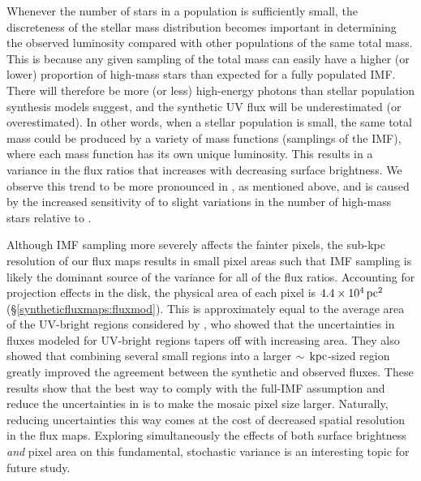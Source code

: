 \documentclass[iop, tighten]{emulateapj}
\begin{document}
Whenever the number of stars in a population is sufficiently small, the
discreteness of the stellar mass distribution becomes important in determining
the observed luminosity compared with other populations of the same total mass.
This is because any given sampling of the total mass can easily have a higher
(or lower) proportion of high-mass stars than expected for a fully populated
IMF. There will therefore be more (or less) high-energy photons than stellar
population synthesis models suggest, and the synthetic UV flux will be
underestimated (or overestimated). In other words, when a stellar population is
small, the same total mass could be produced by a variety of mass functions
(samplings of the IMF), where each mass function has its own unique luminosity.
This results in a variance in the flux ratios that increases with decreasing
surface brightness. We observe this trend to be more pronounced in \fuv{}, as
mentioned above, and is caused by the increased sensitivity of \ffuvobs{} to
slight variations in the number of high-mass stars relative to \fnuvobs{}.

Although IMF sampling more severely affects the fainter pixels, the sub-kpc
resolution of our flux maps results in small pixel areas such that IMF sampling
is likely the dominant source of the variance for all of the flux ratios.
Accounting for projection effects in the disk, the physical area of each pixel
is $4.4\times 10^4\,\mathrm{pc}^2$ (\S \ref{syntheticfluxmaps:fluxmod}). This is
approximately equal to the average area of the UV-bright regions considered by
\citet{Simones:2014}, who showed that the uncertainties in fluxes modeled for
UV-bright regions tapers off with increasing area. They also showed that
combining several small regions into a larger $\sim\,\mathrm{kpc}$-sized region greatly
improved the agreement between the synthetic and observed fluxes. These results
show that the best way to comply with the full-IMF assumption and reduce the
uncertainties in \fxsfh{} is to make the mosaic pixel size larger. Naturally,
reducing uncertainties this way comes at the cost of decreased spatial
resolution in the flux maps. Exploring simultaneously the effects of both
surface brightness \emph{and} pixel area on this fundamental, stochastic
variance is an interesting topic for future study.
\end{document}
